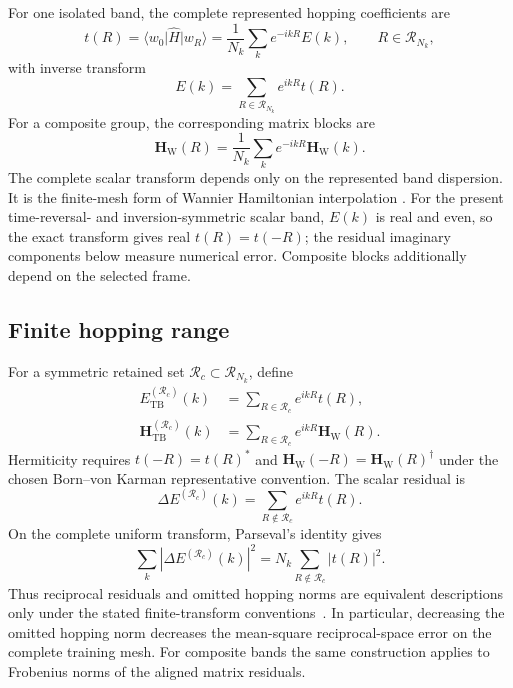 For one isolated band, the complete represented hopping coefficients are
\begin{equation}
    t(R)
    =
    \langle w_0\rvert\hat H\lvert w_R\rangle
    =
    \frac{1}{N_k}\sum_k e^{-ikR}E(k),
    \qquad R\in\mathcal R_{N_k},
    \label{eq:periodic-1d-scalar-hopping}
\end{equation}
with inverse transform
\begin{equation}
    E(k)=\sum_{R\in\mathcal R_{N_k}}e^{ikR}t(R).
\end{equation}
For a composite group, the corresponding matrix blocks are
\begin{equation}
    \mathbf H_{\mathrm W}(R)
    =
    \frac{1}{N_k}\sum_k
    e^{-ikR}\mathbf H_{\mathrm W}(k).
    \label{eq:periodic-1d-block-hopping}
\end{equation}
The complete scalar transform depends only on the represented band dispersion. It is
the finite-mesh form of Wannier Hamiltonian interpolation
\cite{marzari2012,trefethen2000}. For the present time-reversal- and
inversion-symmetric scalar band, $E(k)$ is
real and even, so the exact transform gives real $t(R)=t(-R)$; the residual
imaginary components below measure numerical error. Composite blocks
additionally depend on the selected frame.

\subsection{Finite hopping range}

For a symmetric retained set $\mathcal R_c\subset\mathcal R_{N_k}$, define
\begin{align}
    E_{\mathrm{TB}}^{(\mathcal R_c)}(k)
    &=
    \sum_{R\in\mathcal R_c}e^{ikR}t(R),
    \\
    \mathbf H_{\mathrm{TB}}^{(\mathcal R_c)}(k)
    &=
    \sum_{R\in\mathcal R_c}e^{ikR}\mathbf H_{\mathrm W}(R).
\end{align}
Hermiticity requires $t(-R)=t(R)^\ast$ and
$\mathbf H_{\mathrm W}(-R)=\mathbf H_{\mathrm W}(R)^\dagger$ under the chosen
Born--von Karman representative convention. The scalar residual is
\begin{equation}
    \Delta E^{(\mathcal R_c)}(k)
    =
    \sum_{R\notin\mathcal R_c}e^{ikR}t(R).
\end{equation}
On the complete uniform transform, Parseval's identity gives
\begin{equation}
    \sum_k\left|\Delta E^{(\mathcal R_c)}(k)\right|^2
    =
    N_k\sum_{R\notin\mathcal R_c}|t(R)|^2.
    \label{eq:periodic-1d-parseval}
\end{equation}
Thus reciprocal residuals and omitted hopping norms are equivalent descriptions
only under the stated finite-transform conventions~\cite{trefethen2000}. In particular, decreasing
the omitted hopping norm decreases the mean-square reciprocal-space error on
the complete training mesh. For composite bands the same construction applies
to Frobenius norms of the aligned matrix residuals.

